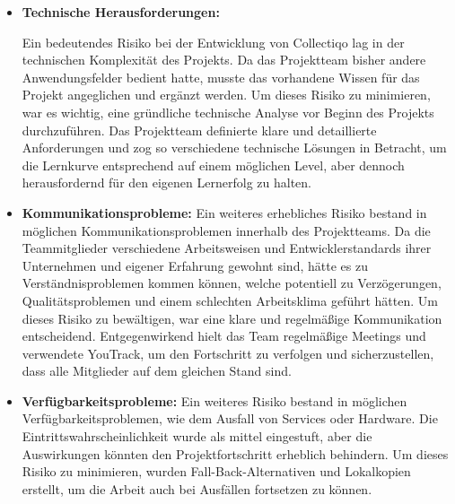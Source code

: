 \begin{itemize}
    \item \textbf{Technische Herausforderungen:}

    Ein bedeutendes Risiko bei der Entwicklung von Collectiqo lag in der technischen Komplexität des Projekts.
    Da das Projektteam bisher andere Anwendungsfelder bedient hatte, musste das vorhandene Wissen für das Projekt angeglichen und ergänzt werden.
    Um dieses Risiko zu minimieren, war es wichtig, eine gründliche technische Analyse vor Beginn des Projekts durchzuführen.
    Das Projektteam definierte klare und detaillierte Anforderungen und zog so verschiedene technische Lösungen in Betracht, um die Lernkurve entsprechend auf einem möglichen Level, aber dennoch herausfordernd für den eigenen Lernerfolg zu halten.

    \item \textbf{Kommunikationsprobleme:}
    Ein weiteres erhebliches Risiko bestand in möglichen Kommunikationsproblemen innerhalb des Projektteams.
    Da die Teammitglieder verschiedene Arbeitsweisen und Entwicklerstandards ihrer Unternehmen und eigener Erfahrung gewohnt sind, hätte es zu Verständnisproblemen kommen können, welche potentiell zu Verzögerungen, Qualitätsproblemen und einem schlechten Arbeitsklima geführt hätten.
    Um dieses Risiko zu bewältigen, war eine klare und regelmäßige Kommunikation entscheidend.
    Entgegenwirkend hielt das Team regelmäßige Meetings und verwendete YouTrack, um den Fortschritt zu verfolgen und sicherzustellen, dass alle Mitglieder auf dem gleichen Stand sind.

    \item \textbf{Verfügbarkeitsprobleme:}
    Ein weiteres Risiko bestand in möglichen Verfügbarkeitsproblemen, wie dem Ausfall von Services oder Hardware.
    Die Eintrittswahrscheinlichkeit wurde als mittel eingestuft, aber die Auswirkungen könnten den Projektfortschritt erheblich behindern.
    Um dieses Risiko zu minimieren, wurden Fall-Back-Alternativen und Lokalkopien erstellt, um die Arbeit auch bei Ausfällen fortsetzen zu können.
\end{itemize}



